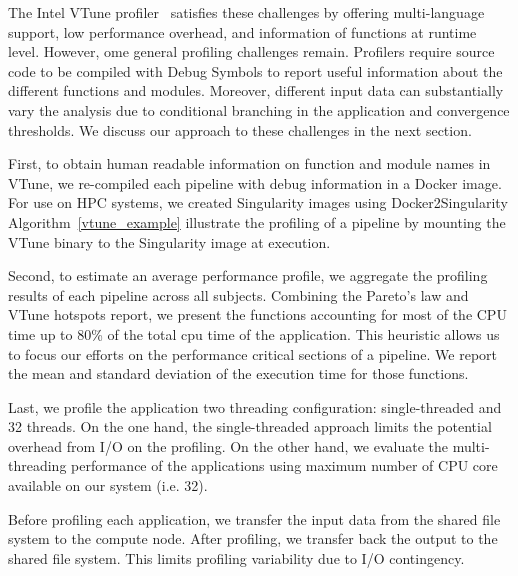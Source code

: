 \documentclass[conference]{IEEEtran}
\renewcommand{\lstlistingname}{Algorithm}
\begin{document}
The Intel VTune profiler~\cite{vtune_profiler} satisfies these challenges by offering multi-language support, low performance overhead, and information of functions at runtime level. However, ome general profiling challenges remain. Profilers require source code to be compiled with Debug Symbols to report useful information about the different functions and modules. Moreover, different input data can substantially vary the analysis due to conditional branching in the application and convergence thresholds. We discuss our approach to these challenges in the next section.

First, to obtain human readable information on function and module names in VTune, we re-compiled each pipeline with debug information in a Docker image. For use on HPC systems, we created Singularity images using Docker2Singularity \lstlistingname~\ref{vtune_example} illustrate the profiling of a pipeline by mounting the VTune binary to the Singularity image at execution.


Second, to estimate an average performance profile, we aggregate the profiling results of each pipeline across all subjects. Combining the Pareto's law and VTune hotspots report, we present the functions accounting for most of the CPU time up to 80\% of the total cpu time of the application. This heuristic allows us to focus our efforts on the performance critical sections of a pipeline. We report the mean and standard deviation of the execution time for those functions.

Last, we profile the application two threading configuration: single-threaded and 32 threads. On the one hand, the single-threaded approach limits the potential overhead from I/O on the profiling. On the other hand, we evaluate the multi-threading performance of the applications using maximum number of CPU core available on our system (i.e. 32).

Before profiling each application, we transfer the input data from the shared file system to the compute node. After profiling, we transfer back the output to the shared file system. This limits profiling variability due to I/O contingency.
\end{document}
